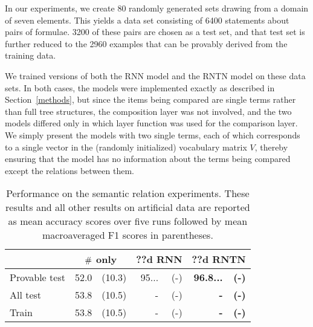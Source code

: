 In our experiments, we create 80 randomly generated sets drawing from
a domain of seven elements. This yields a data set consisting of
6400 statements about pairs of formulae. 3200 of these pairs are
chosen as a test set, and that test set is further reduced to the 2960
examples that can be provably derived from the training data.

We trained versions of both the RNN model and the RNTN model on these
data sets. In both cases, the models were implemented exactly as
described in Section~\ref{methods}, but since the items being compared
are single terms rather than full tree structures, the composition
layer was not involved, and the two models differed only in which
layer function was used for the comparison layer. We simply present
the models with two single terms, each of which corresponds to a
single vector in the (randomly initialized) vocabulary matrix $V$,
thereby ensuring that the model has no information about the terms
being compared except the relations between them.

\begin{table}[tp]
  \centering \small
  \begin{tabular}{ l r@{ \ }r r@{ \ }r r@{ \ }r }
    \toprule
    ~&\multicolumn{2}{c}{$\mathbin{\#}$ only} & \multicolumn{2}{c}{??d RNN}  & \multicolumn{2}{c}{??d RNTN}\\
    \midrule
    Provable test &52.0 &(10.3) &	95...&(-)& \textbf{96.8...} & \textbf{(-)}\\
    All test &53.8 &(10.5) &	-&(-)& \textbf{-} & \textbf{(-)}\\
    Train &53.8 &(10.5)    & -&(-)& \textbf{-} & \textbf{(-)}\\

    \bottomrule
  \end{tabular}
  \caption{Performance on the semantic relation experiments. These results and all other results on artificial data are reported as mean accuracy scores over five runs followed by mean macroaveraged F1 scores in parentheses.}
  \label{joinresultstable}
\end{table}

